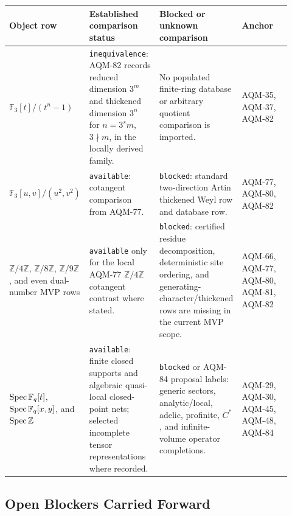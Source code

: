 \begin{center}
\scriptsize\setlength{\tabcolsep}{3pt}
\begin{tabular}{p{0.19\linewidth}p{0.26\linewidth}p{0.25\linewidth}p{0.22\linewidth}}
\toprule
Object row & Established comparison status & Blocked or unknown comparison & Anchor \\
\midrule
\(\mathbb F_3[t]/(t^n-1)\) &
\texttt{inequivalence}: AQM-82 records reduced dimension \(3^m\) and
thickened dimension \(3^n\) for \(n=3^s m\), \(3\nmid m\), in the locally
derived family. &
No populated finite-ring database or arbitrary quotient comparison is
imported. &
AQM-35, AQM-37, AQM-82 \\
\addlinespace
\(\mathbb F_3[u,v]/(u^2,v^2)\) &
\texttt{available}: cotangent comparison from AQM-77. &
\texttt{blocked}: standard two-direction Artin thickened Weyl row and
database row. &
AQM-77, AQM-80, AQM-82 \\
\addlinespace
\(\mathbb Z/4\mathbb Z\), \(\mathbb Z/8\mathbb Z\),
\(\mathbb Z/9\mathbb Z\), and even dual-number MVP rows &
\texttt{available} only for the local AQM-77 \(\mathbb Z/4\mathbb Z\)
cotangent contrast where stated. &
\texttt{blocked}: certified residue decomposition, deterministic site
ordering, and generating-character/thickened rows are missing in the current
MVP scope. &
AQM-66, AQM-77, AQM-80, AQM-81, AQM-82 \\
\addlinespace
\(\operatorname{Spec}\mathbb F_q[t]\), \(\operatorname{Spec}\mathbb F_q[x,y]\), and \(\operatorname{Spec}\mathbb Z\) &
\texttt{available}: finite closed supports and algebraic quasi-local
closed-point nets; selected incomplete tensor representations where recorded. &
\texttt{blocked} or AQM-84 proposal labels: generic sectors, analytic/local,
adelic, profinite, \(C^*\), and infinite-volume operator completions. &
AQM-29, AQM-30, AQM-45, AQM-48, AQM-84 \\
\bottomrule
\end{tabular}
\end{center}

\subsection{Open Blockers Carried Forward}

